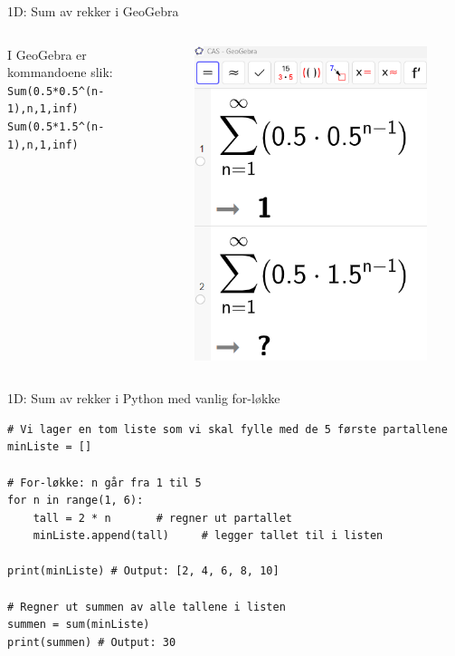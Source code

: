 \blueheader
\begin{frame}{1D: Sum av rekker i GeoGebra}
\centering
\begin{columns}
\begin{column}{0.4\textwidth}
I GeoGebra er kommandoene slik:\\
\vspace{1cm}
\texttt{Sum(0.5*0.5\textasciicircum(n-1),n,1,inf)}\\
\vspace{1cm}
\texttt{Sum(0.5*1.5\textasciicircum(n-1),n,1,inf)}
\end{column}

\begin{column}{0.6\textwidth}
\begin{figure}
    \includegraphics[width=0.6\linewidth]{R2K1D-7.png}
\end{figure}
\end{column}
\end{columns}
\end{frame}

\blueheader
\begin{frame}[fragile]{1D: Sum av rekker i Python med vanlig for-løkke}
\begin{verbatim}
# Vi lager en tom liste som vi skal fylle med de 5 første partallene
minListe = []

# For-løkke: n går fra 1 til 5
for n in range(1, 6):
    tall = 2 * n       # regner ut partallet
    minListe.append(tall)     # legger tallet til i listen

print(minListe) # Output: [2, 4, 6, 8, 10]

# Regner ut summen av alle tallene i listen
summen = sum(minListe)
print(summen) # Output: 30

\end{verbatim}
\end{frame}



